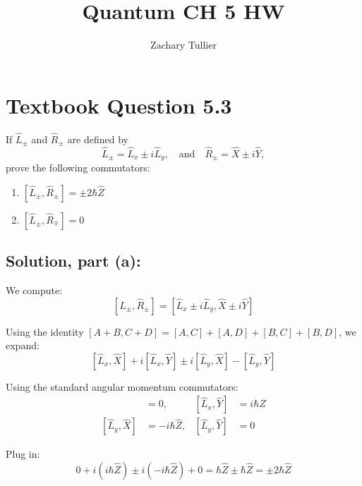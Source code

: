 \documentclass[12pt]{article}
\begin{document}
\singlespacing  %
\title{Quantum CH 5 HW}

\author[1]{Zachary Tullier}
\date{}
\maketitle

\section{Textbook Question 5.3}
    If \( \hat{L}_\pm \) and \( \hat{R}_\pm \) are defined by
    \[
        \hat{L}_\pm = \hat{L}_x \pm i \hat{L}_y, \quad \text{and} \quad \hat{R}_\pm = \hat{X} \pm i \hat{Y},
    \]
    prove the following commutators:
    
    \begin{enumerate}
        \item[(a)] \( [\hat{L}_\pm, \hat{R}_\pm] = \pm 2 \hbar \hat{Z} \)
        \item[(b)] \( [\hat{L}_\pm, \hat{R}_\mp] = 0 \)
    \end{enumerate}

    \subsection{Solution, part (a):}
        We compute:
        \[
            [\hat{L}_\pm, \hat{R}_\pm] = [\hat{L}_x \pm i \hat{L}_y, \hat{X} \pm i \hat{Y}]
        \]
        
        Using the identity \( [A + B, C + D] = [A, C] + [A, D] + [B, C] + [B, D] \), we expand:
        \[
            [\hat{L}_x, \hat{X}] + i[\hat{L}_x, \hat{Y}] \pm i[\hat{L}_y, \hat{X}] - [\hat{L}_y, \hat{Y}]
        \]

        Using the standard angular momentum commutators:
        \begin{align*}
            [\hat{L}_x, \hat{X}] &= 0, & [\hat{L}_x, \hat{Y}] &= i\hbar \hat{Z} \\
            [\hat{L}_y, \hat{X}] &= -i\hbar \hat{Z}, & [\hat{L}_y, \hat{Y}] &= 0
        \end{align*}

        Plug in:
        \[
            0 + i(i\hbar \hat{Z}) \pm i(-i\hbar \hat{Z}) + 0 = \hbar \hat{Z} \pm \hbar \hat{Z} = \boxed{ \pm 2\hbar \hat{Z} }
        \]
\end{document}
